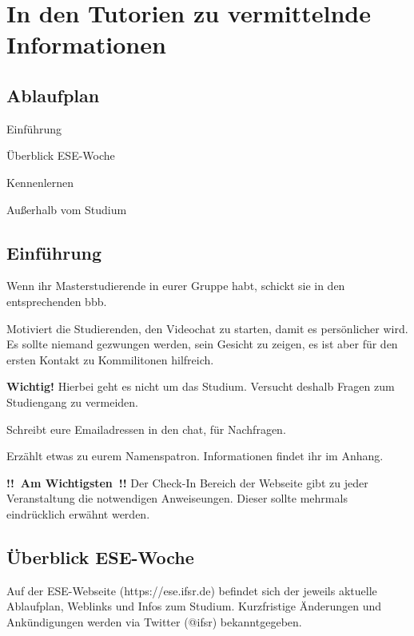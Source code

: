 \documentclass[a4paper,12pt]{scrreprt}
\begin{document}
\chapter{In den Tutorien zu vermittelnde Informationen}

\section{Ablaufplan}

\begin{itemize*}
    \item Einführung
    \item Überblick ESE-Woche
    \item Kennenlernen
    \item Außerhalb vom Studium
\end{itemize*}

\section{Einführung}
\begin{itemize*}
    \item Wenn ihr Masterstudierende in eurer Gruppe habt, schickt sie in den entsprechenden bbb.
    \item Motiviert die Studierenden, den Videochat zu starten, damit es persönlicher wird. Es sollte niemand gezwungen werden, sein Gesicht zu zeigen, es ist aber für den ersten Kontakt zu Kommilitonen hilfreich.
    \item \textbf{Wichtig!} Hierbei geht es nicht um das Studium. Versucht deshalb Fragen zum Studiengang zu vermeiden.
    \item Schreibt eure Emailadressen in den chat, für Nachfragen.
    \item Erzählt etwas zu eurem Namenspatron. Informationen findet ihr im Anhang.
    \item \textbf{!!~Am Wichtigsten~!!} Der Check-In Bereich der Webseite gibt zu jeder Veranstaltung die notwendigen Anweiseungen. Dieser sollte mehrmals eindrücklich erwähnt werden.
\end{itemize*}

\pagebreak

\section{Überblick ESE-Woche}

\begin{framed}
Auf der ESE-Webseite (https://ese.ifsr.de) befindet sich der jeweils aktuelle Ablaufplan, Weblinks und Infos zum Studium. Kurzfristige Änderungen und Ankündigungen werden via Twitter (@ifsr) bekanntgegeben.
\end{framed}
\end{document}
